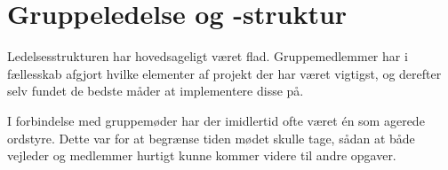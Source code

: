 \section{Gruppeledelse og -struktur}
Ledelsesstrukturen har hovedsageligt været flad. Gruppemedlemmer har i fællesskab afgjort hvilke elementer af projekt der har været vigtigst, og derefter selv fundet de bedste måder at implementere disse på.

I forbindelse med gruppemøder har der imidlertid ofte været én som agerede ordstyre. Dette var for at begrænse tiden mødet skulle tage, sådan at både vejleder og medlemmer hurtigt kunne kommer videre til andre opgaver.
